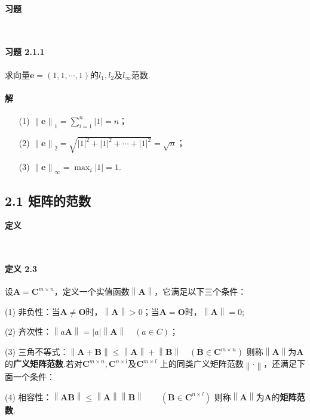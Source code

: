 \documentclass[12pt, a4paper, oneside, fontset=none]{ctexart}
\begin{document}
\par \ \par

\centerline{\large{\textbf{习题}}} \ \par

\paragraph*{习题 2.1.1} 求向量$\bm{e} = (1,1,\cdots,1)$的$l_1,l_2$及$l_\infty$范数.

\paragraph*{解}
\begin{enumerate}
    \item[(1)] $\left\lVert \bm{e} \right\rVert _1 = \sum_{i=1}^n\left\lvert 1 \right\rvert = n$；
    \item[(2)] $\left\lVert \bm{e} \right\rVert _2 = \sqrt{\left\lvert 1 \right\rvert^2 + \left\lvert 1 \right\rvert^2 + \cdots + \left\lvert 1 \right\rvert^2} = \sqrt{n}$；
    \item[(3)] $\left\lVert \bm{e} \right\rVert _\infty = \max_i \left\lvert 1 \right\rvert = 1$.
\end{enumerate}

\subsection*{2.1 \quad 矩阵的范数}

\centerline{\large{\textbf{定义}}} \ \par

\paragraph*{定义 2.3} 设$\bm{A} = \bm{C}^{m\times n}$，定义一个实值函数$\left\lVert \bm{A} \right\rVert$，它满足以下三个条件：\par
(1) 非负性：当$\bm{A} \neq \bm{O}$时，$\left\lVert \bm{A} \right\rVert > 0$；当$\bm{A} = \bm{O}$时，$\left\lVert \bm{A} \right\rVert = 0$; \par
(2) 齐次性：$\left\lVert a\bm{A} \right\rVert = \left\lvert a \right\rvert \left\lVert \bm{A} \right\rVert \quad (a \in C)$；\par
(3) 三角不等式：$\left\lVert \bm{A} + \bm{B} \right\rVert \leqslant \left\lVert \bm{A} \right\rVert + \left\lVert \bm{B} \right\rVert \quad (\bm{B} \in \bm{C}^{m\times n})$
则称$\left\lVert \bm{A} \right\rVert$为$\bm{A}$的\textbf{广义矩阵范数}.若对$\bm{C}^{m\times n},\bm{C}^{n\times l}$及$\bm{C}^{m\times l}$
上的同类广义矩阵范数$\left\lVert \bm{\cdot} \right\rVert$，还满足下面一个条件：\par
(4) 相容性：$\left\lVert \bm{AB} \right\rVert \leqslant \left\lVert \bm{A} \right\rVert \left\lVert \bm{B} \right\rVert \qquad (\bm{B} \in \bm{C}^{n\times l})$
则称$\left\lVert \bm{A} \right\rVert$为$\bm{A}$的\textbf{矩阵范数}.
\end{document}
